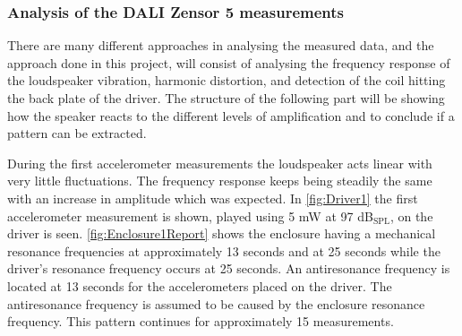 \subsubsection{Analysis of the DALI Zensor 5 measurements}

There are many different approaches in analysing the measured data, and the approach done in this project, will consist of analysing the frequency response of the loudspeaker vibration, harmonic distortion, and detection of the coil hitting the back plate of the driver. The structure of the following part will be showing how the speaker reacts to the different levels of amplification and to conclude if a pattern can be extracted.




During the first accelerometer measurements the loudspeaker acts linear with very little fluctuations. The frequency response keeps being steadily the same with an increase in amplitude which was expected. In \autoref{fig:Driver1} the first accelerometer measurement is shown, played using 5 mW at 97 dB$_{\text{SPL}}$, on the driver is seen. \autoref{fig:Enclosure1Report} shows the enclosure having a mechanical resonance frequencies at approximately 13 seconds and at 25 seconds while the driver's resonance frequency occurs at 25 seconds. An antiresonance frequency is located at 13 seconds for the accelerometers placed on the driver. The antiresonance frequency is assumed to be caused by the enclosure resonance frequency. This pattern continues for approximately 15 measurements. 


